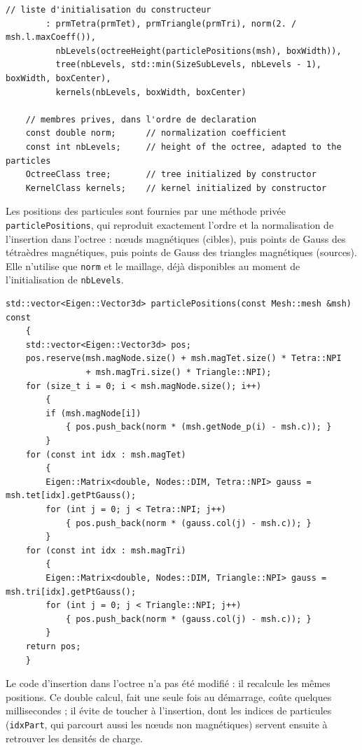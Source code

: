 \documentclass[11pt,a4paper]{article}
\newcommand{\code}[1]{\texttt{#1}}
\begin{document}
\begin{lstlisting}[caption={Membres et liste d'initialisation (\code{src/fmm\_demag.h}).}]
    // liste d'initialisation du constructeur
        : prmTetra(prmTet), prmTriangle(prmTri), norm(2. / msh.l.maxCoeff()),
          nbLevels(octreeHeight(particlePositions(msh), boxWidth)),
          tree(nbLevels, std::min(SizeSubLevels, nbLevels - 1), boxWidth, boxCenter),
          kernels(nbLevels, boxWidth, boxCenter)

    // membres prives, dans l'ordre de declaration
    const double norm;      // normalization coefficient
    const int nbLevels;     // height of the octree, adapted to the particles
    OctreeClass tree;       // tree initialized by constructor
    KernelClass kernels;    // kernel initialized by constructor
\end{lstlisting}

Les positions des particules sont fournies par une méthode privée \code{particlePositions}, qui
reproduit exactement l'ordre et la normalisation de l'insertion dans l'octree : nœuds magnétiques
(cibles), puis points de Gauss des tétraèdres magnétiques, puis points de Gauss des triangles
magnétiques (sources). Elle n'utilise que \code{norm} et le maillage, déjà disponibles au moment
de l'initialisation de \code{nbLevels}.

\begin{lstlisting}[caption={Positions normalisées des particules (\code{src/fmm\_demag.h}).}]
std::vector<Eigen::Vector3d> particlePositions(const Mesh::mesh &msh) const
    {
    std::vector<Eigen::Vector3d> pos;
    pos.reserve(msh.magNode.size() + msh.magTet.size() * Tetra::NPI
                + msh.magTri.size() * Triangle::NPI);
    for (size_t i = 0; i < msh.magNode.size(); i++)
        {
        if (msh.magNode[i])
            { pos.push_back(norm * (msh.getNode_p(i) - msh.c)); }
        }
    for (const int idx : msh.magTet)
        {
        Eigen::Matrix<double, Nodes::DIM, Tetra::NPI> gauss = msh.tet[idx].getPtGauss();
        for (int j = 0; j < Tetra::NPI; j++)
            { pos.push_back(norm * (gauss.col(j) - msh.c)); }
        }
    for (const int idx : msh.magTri)
        {
        Eigen::Matrix<double, Nodes::DIM, Triangle::NPI> gauss = msh.tri[idx].getPtGauss();
        for (int j = 0; j < Triangle::NPI; j++)
            { pos.push_back(norm * (gauss.col(j) - msh.c)); }
        }
    return pos;
    }
\end{lstlisting}

Le code d'insertion dans l'octree n'a pas été modifié : il recalcule les mêmes positions. Ce
double calcul, fait une seule fois au démarrage, coûte quelques millisecondes ; il évite de
toucher à l'insertion, dont les indices de particules (\code{idxPart}, qui parcourt aussi les
nœuds non magnétiques) servent ensuite à retrouver les densités de charge.
\end{document}
